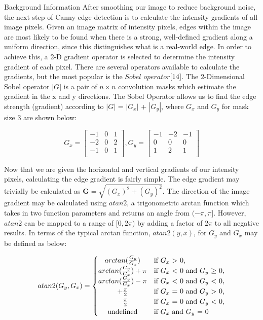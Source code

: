 \documentclass[a4paper,12pt]{article}
\begin{document}
\begin{section}{Background Information}
After smoothing our image to reduce background noise, the next step of Canny edge detection is to calculate the intensity gradients of all image pixels. Given an image matrix of intensity pixels, edges within the image are most likely to be found when there is a strong, well-defined gradient along a uniform direction, since this distinguishes what is a real-world edge. In order to achieve this, a 2-D gradient operator is selected to determine the intensity gradient of each pixel. There are several operators available to calculate the gradients, but the most popular is the $Sobel$ $operator$$\cite{14}$.%
The 2-Dimensional Sobel operator $|G|$ is a pair of $n\times n$ convolution masks which estimate the gradient in the x and y directions. The Sobel Operator allows us to find the edge strength (gradient) according to $|G|$ = $|G_x|$ + $|G_y|$, where $G_x$ and $G_y$ for mask size 3 are shown below:

\singlespacing
\begin{center}
\[G_x = 
\begin{bmatrix}
-1 & 0 & 1\\
-2 & 0 & 2\\
-1 & 0 & 1\\
\end{bmatrix}
, G_y =
\begin{bmatrix}
-1 & -2 & -1\\
0 & 0 & 0\\
1 & 2 & 1\\
\end{bmatrix}
\]
\end{center}
\doublespacing

Now that we are given the horizontal and vertical gradients of our intensity pixels, calculating the edge gradient is fairly simple.
The edge gradient may trivially be calculated as $\textbf{G} = \sqrt{(G_x)^2 + (G_y)^2}$. 
The direction of the image gradient may be calculated using $atan2$, a trigonometric arctan function which takes in two function parameters and returns an angle from $(-\pi,\pi]$.
However, $atan2$ can be mapped to a range of $[0,2\pi)$ by adding a factor of $2\pi$ to all negative results.
In terms of the typical arctan function, $atan2(y,x)$, for $G_y$ and $G_x$ may be defined as below:

\singlespacing
\begin{center}
\[
atan2(G_y, G_x) = \left\{\def\arraystretch{1.2}%
  \begin{array}{@{}c@{\quad}l@{}}
	arctan(\frac{G_y}{G_x}) & \text{if $G_x$ $>$ 0,}\\
	arctan(\frac{G_y}{G_x}) + \pi & \text{if $G_x$ $<$ 0 and $G_y$ $\geq$ 0,}\\  
	arctan(\frac{G_y}{G_x}) - \pi & \text{if $G_x$ $<$ 0 and $G_y$ $<$ 0,}\\
	+\frac{\pi}{2} & \text{if $G_x$ = 0 and $G_y$ $>$ 0,}\\
	-\frac{\pi}{2} & \text{if $G_x$ = 0 and $G_y$ $<$ 0,}\\
	\text{undefined} & \text{if $G_x$ and $G_y$ = 0}\\
  \end{array}\right.
\]
\end{center}
\doublespacing


\end{section}
\end{document}
